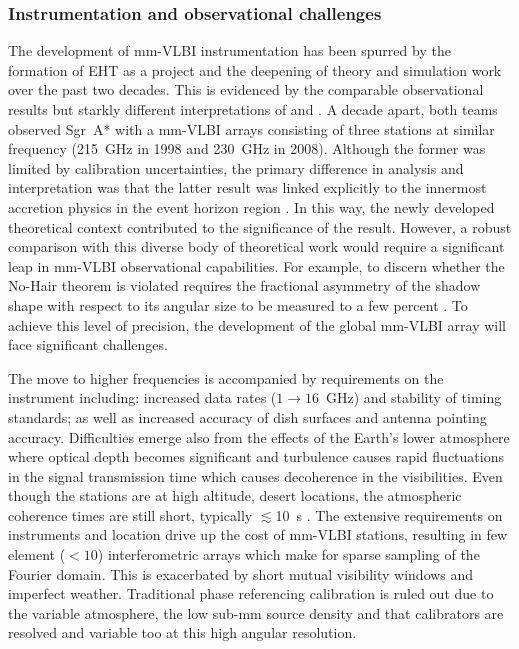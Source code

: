 \subsubsection{Instrumentation and observational challenges}\label{sec:eht_obs}

The development of mm-VLBI instrumentation has been spurred by the formation of EHT as a project and the deepening of theory and simulation work over the past two decades. This is evidenced by the comparable observational results but starkly different interpretations of \citet{Krichbaum_1998} and \citet{Doeleman_2008}. A decade apart, both teams observed Sgr~A* with a mm-VLBI arrays consisting of three stations at similar frequency (215~GHz in 1998 and 230~GHz in 2008). Although the former was limited by calibration uncertainties, the primary difference in analysis and interpretation was that the latter result was linked explicitly to the innermost accretion physics in the event horizon region \citep[e.g.][]{Broderick_2011}. In this way, the newly developed theoretical context contributed to the significance of the \citet{Doeleman_2008} result. However, a robust comparison with this diverse body of theoretical work would require a significant leap in mm-VLBI observational capabilities. For example, to discern whether the No-Hair theorem is violated requires the fractional asymmetry of the shadow shape with respect to its angular size to be measured to a few percent \citep[e.g.][and references therein]{Goddi_2016}. To achieve this level of precision, the development of the global mm-VLBI array will face significant challenges.


The move to higher frequencies is accompanied by requirements on the instrument including: increased data rates ($1 \to 16$~GHz) and stability of timing standards; as well as increased accuracy of dish surfaces and antenna pointing accuracy. Difficulties emerge also from the effects of the Earth's lower atmosphere where optical depth becomes significant and turbulence causes rapid fluctuations in the signal transmission time which causes decoherence in the visibilities. Even though the stations are at high altitude, desert locations, the atmospheric coherence times are still short, typically $\lesssim$10~s \citep{Doeleman_2009}. The extensive requirements on instruments and location drive up the cost of mm-VLBI stations, resulting in few element ($<10$) interferometric arrays which make for sparse sampling of the Fourier domain. This is exacerbated by short mutual visibility windows and imperfect weather. Traditional phase referencing calibration is ruled out due to the variable atmosphere, the low sub-mm source density and that calibrators are resolved and variable too at this high angular resolution. 


